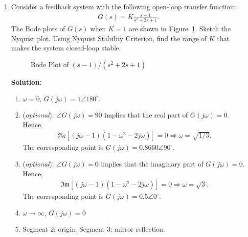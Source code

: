 \documentclass{article}
\newlength\figureheight
\newlength\figurewidth
\newcommand{\tikzdir}[1]{tikz/#1.tikz}
\newcommand{\inputtikz}[1]{}}
\begin{document}
\begin{enumerate}
  {\bf Solution:}
  \begin{enumerate}
  \item The initial slope is $-20$: $1/s$
  \item The low frequency line passes through $(0.2,20dB)$:
    \begin{align*}
      20\log K - 20 \log 0.2 = 20\Rightarrow K = 2.
    \end{align*}
  \item The slope change to -40 at frequency $0.2$: $(s/0.2+1)^{-1}$
  \item The slope change to 0 at frequency $2$, the correction is $-14dB$:
    \begin{align*}
      \omega_n = 2,\,20\log 2\zeta = -14 \Rightarrow \zeta = 0.1.
    \end{align*}
  \item The slope change to -20 at frequency $5$: $(s/20+1)^{-1}$
  \end{enumerate}
\begin{align*}
  G(s) = \frac{2\left[(s/2)^2+0.2\times s/2+1\right]}{s(s/20+1)(s/0.2+1)}.
\end{align*}

  \newpage
\item Consider a feedback system with the following open-loop transfer function:
  \begin{align*}
    G(s) = K\frac{s-1}{s^2+2s+1}.
  \end{align*}
  The Bode plots of $G(s)$ when $K = 1$ are shown in Figure~\ref{fig:2}. Sketch the Nyquist plot. Using Nyquist Stability Criterion, find the range of $K$ that makes the system closed-loop stable.
  \begin{figure}[ht]
    \setlength\figureheight{4cm}
    \setlength\figurewidth{14cm}
    \centering
    \inputtikz{Quiz24}
    \caption{Bode Plot of $(s-1)/(s^2+2s+1)$\label{fig:2}}
  \end{figure}
  {\bf Solution:}
  \begin{enumerate}

  \item $\omega = 0$, $G(j\omega) = 1\angle 180^\circ$.
  \item ({\it optional}): $\angle G(j\omega) = 90$ implies that the real part of $G(j\omega) = 0$. Hence,
    \begin{align*}
      \mathfrak{Re}\left[(j\omega - 1)(1-\omega^2 -2j\omega)\right] = 0 \Rightarrow \omega = \sqrt{1/3}.
    \end{align*}
    The corresponding point is $G(j\omega) = 0.8660\angle 90^\circ$.
  \item ({\it optional}): $\angle G(j\omega) = 0$ implies that the imaginary part of $G(j\omega) = 0$. Hence,
    \begin{align*}
      \mathfrak{Im}\left[(j\omega - 1)(1-\omega^2 -2j\omega)\right] = 0 \Rightarrow \omega = \sqrt{3}.
    \end{align*}
    The corresponding point is $G(j\omega) = 0.5\angle 0^\circ$.
  \item $\omega\rightarrow \infty$, $G(j\omega) = 0$
  \item Segment 2: origin; Segment 3: mirror reflection.


\end{enumerate}
\end{enumerate}
\end{document}
